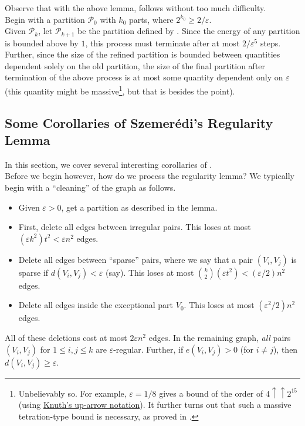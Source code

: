 			Observe that with the above lemma,  follows without too much difficulty.\\
			Begin with a partition $\mathcal{P}_0$ with $k_0$ parts, where $2^{k_0} \ge 2/\varepsilon$.\\
			Given $\mathcal{P}_k$, let $\mathcal{P}_{k+1}$ be the partition defined by . Since the energy of any partition is bounded above by $1$, this process must terminate after at most $2/\varepsilon^5$ steps.\\
			Further, since the size of the refined partition is bounded between quantities dependent solely on the old partition, the size of the final partition after termination of the above process is at most some quantity dependent only on $\varepsilon$ (this quantity might be massive\footnote{Unbelievably so. For example, $\varepsilon=1/8$ gives a bound of the order of $4\uparrow\uparrow 2^{15}$ (using \href{https://en.wikipedia.org/wiki/Knuths_up-arrow_notation}{Knuth's up-arrow notation}). It further turns out that such a massive tetration-type bound is necessary, as proved in \cite{Gowers1997}.}, but that is besides the point).\\

	\subsection{Some Corollaries of Szemer\'{e}di's Regularity Lemma}

		In this section, we cover several interesting corollaries of .\\

		Before we begin however, how do we process the regularity lemma? We typically begin with a ``cleaning'' of the graph as follows.
		\begin{itemize}
			\item Given $\varepsilon > 0$, get a partition as described in the lemma.
			\item First, delete all edges between irregular pairs. This loses at most $(\varepsilon k^2) t^2 < \varepsilon n^2$ edges.
			\item Delete all edges between ``sparse'' pairs, where we say that a pair $(V_i,V_j)$ is sparse if $d(V_i,V_j) < \varepsilon$ (say). This loses at most $\binom{k}{2} (\varepsilon t^2) < (\varepsilon/2)n^2$ edges.
			\item Delete all edges inside the exceptional part $V_0$. This loses at most $(\varepsilon^2/2)n^2$ edges. 
		\end{itemize}
		All of these deletions cost at most $2\varepsilon n^2$ edges. In the remaining graph, \emph{all} pairs $(V_i,V_j)$ for $1 \le i,j\le k$ are $\varepsilon$-regular. Further, if $e(V_i,V_j) > 0$ (for $i\ne j$), then $d(V_i,V_j) \ge \varepsilon$.\\

